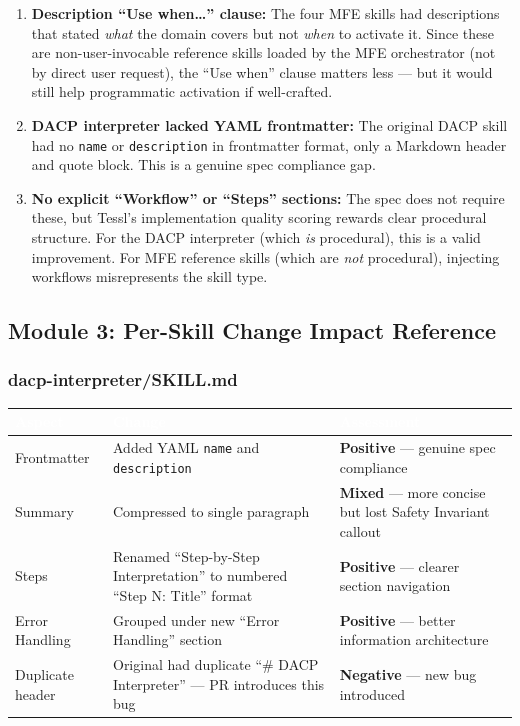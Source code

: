 \documentclass[11pt,letterpaper]{article}
\newcommand{\tableheader}[1]{\textbf{\sffamily\textcolor{white}{#1}}}
\begin{document}
\begin{enumerate}[leftmargin=2em]
\item \textbf{Description ``Use when\ldots'' clause:} The four MFE skills had descriptions that stated \emph{what} the domain covers but not \emph{when} to activate it. Since these are non-user-invocable reference skills loaded by the MFE orchestrator (not by direct user request), the ``Use when'' clause matters less --- but it would still help programmatic activation if well-crafted.

\item \textbf{DACP interpreter lacked YAML frontmatter:} The original DACP skill had no \texttt{name} or \texttt{description} in frontmatter format, only a Markdown header and quote block. This is a genuine spec compliance gap.

\item \textbf{No explicit ``Workflow'' or ``Steps'' sections:} The spec does not require these, but Tessl's implementation quality scoring rewards clear procedural structure. For the DACP interpreter (which \emph{is} procedural), this is a valid improvement. For MFE reference skills (which are \emph{not} procedural), injecting workflows misrepresents the skill type.
\end{enumerate}

\subsection{Module 3: Per-Skill Change Impact Reference}

\subsubsection{dacp-interpreter/SKILL.md}

\begin{center}
\begin{tabularx}{\textwidth}{L{3cm}XX}
\toprule
{}
\tableheader{Aspect} & \tableheader{Change} & \tableheader{Assessment} \\
\midrule
Frontmatter & Added YAML \texttt{name} and \texttt{description} & \textbf{Positive} --- genuine spec compliance \\
Summary & Compressed to single paragraph & \textbf{Mixed} --- more concise but lost Safety Invariant callout \\
Steps & Renamed ``Step-by-Step Interpretation'' to numbered ``Step N: Title'' format & \textbf{Positive} --- clearer section navigation \\
Error Handling & Grouped under new ``Error Handling'' section & \textbf{Positive} --- better information architecture \\
Duplicate header & Original had duplicate ``\# DACP Interpreter'' --- PR introduces this bug & \textbf{Negative} --- new bug introduced \\
\bottomrule
\end{tabularx}
\end{center}
\end{document}
